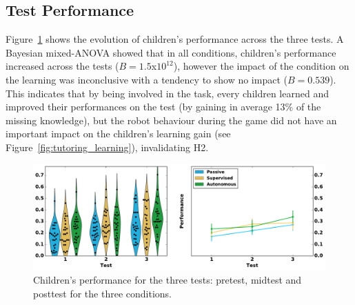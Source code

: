%


\subsection{Test Performance}

Figure~\ref{fig:tutoring_performance} shows the evolution of children's performance across the three tests. A Bayesian mixed-ANOVA showed that in all conditions, children's performance increased across the tests ($B=1.5$x$10^{12}$), however the impact of the condition on the learning was inconclusive with a tendency to show no impact ($B=0.539$). This indicates that by being involved in the task, every children learned and improved their performances on the test (by gaining in average 13\% of the missing knowledge), but the robot behaviour during the game did not have an important impact on the children's learning gain (see Figure~\ref{fig:tutoring_learning}), invalidating H2.

\begin{figure}[ht]
	\includegraphics[width=1\linewidth]{perf.pdf}
	\centering
	\caption{Children's performance for the three tests: pretest, midtest and posttest for the three conditions.}
	\label{fig:tutoring_performance}
\end{figure}


